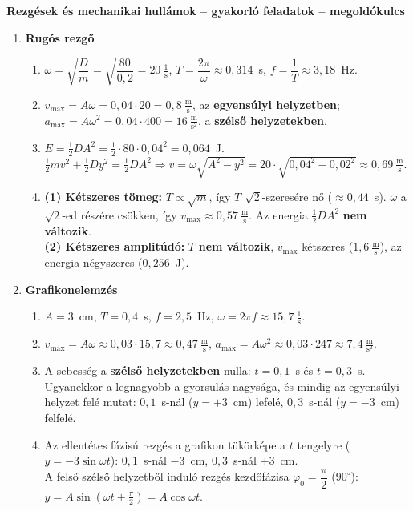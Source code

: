 \documentclass[11pt,a4paper]{article}
\begin{document}
\begin{center}
  {\Large\bfseries Rezgések és mechanikai hullámok -- gyakorló feladatok -- megoldókulcs}
\end{center}

\begin{enumerate}
\item \textbf{Rugós rezgő}
  \begin{enumerate}
    \item $\omega = \sqrt{\dfrac{D}{m}} = \sqrt{\dfrac{80}{0{,}2}} = 20~\tfrac1{\text{s}}$, \quad
      $T = \dfrac{2\pi}{\omega} \approx 0{,}314$~s, \quad $f = \dfrac1T \approx 3{,}18$~Hz.
    \item $v_\text{max} = A\omega = 0{,}04\cdot 20 = 0{,}8~\tfrac{\text{m}}{\text{s}}$, az
      \textbf{egyensúlyi helyzetben};\\
      $a_\text{max} = A\omega^2 = 0{,}04\cdot 400 = 16~\tfrac{\text{m}}{\text{s}^2}$, a
      \textbf{szélső helyzetekben}.
    \item $E = \tfrac12 DA^2 = \tfrac12\cdot 80\cdot 0{,}04^2 = 0{,}064$~J.\\
      $\tfrac12 mv^2 + \tfrac12 Dy^2 = \tfrac12 DA^2 \Rightarrow
      v = \omega\sqrt{A^2 - y^2} = 20\cdot\sqrt{0{,}04^2 - 0{,}02^2} \approx
      0{,}69~\tfrac{\text{m}}{\text{s}}$.
    \item \textbf{(1) Kétszeres tömeg:} $T \propto \sqrt m$, így $T$ $\sqrt2$-szeresére nő
      ($\approx 0{,}44$~s). $\omega$ a $\sqrt2$-ed részére csökken, így
      $v_\text{max} \approx 0{,}57~\tfrac{\text{m}}{\text{s}}$. Az energia
      $\tfrac12 DA^2$ \textbf{nem változik}.\\
      \textbf{(2) Kétszeres amplitúdó:} $T$ \textbf{nem változik}, $v_\text{max}$ kétszeres
      ($1{,}6~\tfrac{\text{m}}{\text{s}}$), az energia négyszeres ($0{,}256$~J).
  \end{enumerate}

\item \textbf{Grafikonelemzés}
  \begin{enumerate}
    \item $A = 3$~cm, $T = 0{,}4$~s, $f = 2{,}5$~Hz, $\omega = 2\pi f \approx 15{,}7~\tfrac1{\text{s}}$.
    \item $v_\text{max} = A\omega \approx 0{,}03\cdot 15{,}7 \approx 0{,}47~\tfrac{\text{m}}{\text{s}}$,
      \quad $a_\text{max} = A\omega^2 \approx 0{,}03\cdot 247 \approx 7{,}4~\tfrac{\text{m}}{\text{s}^2}$.
    \item A sebesség a \textbf{szélső helyzetekben} nulla: $t = 0{,}1$~s és $t = 0{,}3$~s.
      Ugyanekkor a legnagyobb a gyorsulás nagysága, és mindig az egyensúlyi helyzet felé
      mutat: $0{,}1$~s-nál ($y = +3$~cm) lefelé, $0{,}3$~s-nál ($y = -3$~cm) felfelé.
    \item Az ellentétes fázisú rezgés a grafikon tükörképe a $t$ tengelyre
      ($y = -3\sin\omega t$): $0{,}1$~s-nál $-3$~cm, $0{,}3$~s-nál $+3$~cm.\\
      A felső szélső helyzetből induló rezgés kezdőfázisa
      $\varphi_0 = \dfrac{\pi}{2}$ ($90^\circ$): $y = A\sin\left(\omega t + \tfrac{\pi}{2}\right)
      = A\cos\omega t$.
  \end{enumerate}


\end{enumerate}
\end{document}

